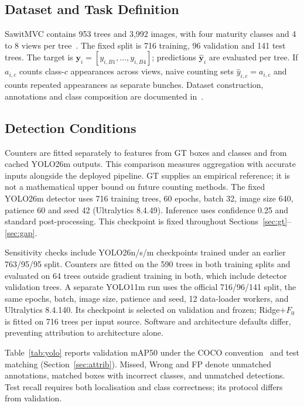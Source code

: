 \documentclass[conference,a4paper]{IEEEtran}
\begin{document}
\subsection{Dataset and Task Definition}
\label{sec:task}
SawitMVC contains 953 trees and 3,992 images, with four maturity classes and
4 to 8 views per tree~\cite{refIndriani2026}. The fixed split is 716 training,
96 validation and 141 test trees. The target is
$\mathbf y_i=[y_{i,B1},\ldots,y_{i,B4}]$; predictions
$\hat{\mathbf y}_i$ are evaluated per tree. If $a_{i,c}$ counts class-$c$
appearances across views, naive counting sets $\hat y_{i,c}=a_{i,c}$ and counts
repeated appearances as separate bunches. Dataset construction, annotations
and class composition are documented in~\cite{refIndriani2026}.

\subsection{Detection Conditions}
Counters are fitted separately to features from GT boxes and classes and from
cached YOLO26m outputs. This comparison measures aggregation with accurate
inputs alongside the deployed pipeline. GT supplies an empirical reference;
it is not a mathematical upper bound on future counting methods. The fixed YOLO26m detector uses 716 training trees, 60 epochs,
batch 32, image size 640, patience 60 and seed 42 (Ultralytics 8.4.49). Inference
uses confidence 0.25 and standard post-processing. This checkpoint is fixed
throughout Sections~\ref{sec:gt}--\ref{sec:gap}.

Sensitivity checks include YOLO26n/s/m checkpoints trained under an earlier
763/95/95 split. Counters are fitted on the 590 trees in both training splits
and evaluated on 64 trees outside gradient training in both, which include
detector validation trees. A separate YOLO11m run uses the official 716/96/141 split,
the same epochs, batch, image size, patience and seed, 12 data-loader workers,
and Ultralytics 8.4.140. Its checkpoint is selected on validation and frozen;
Ridge$+F_0$ is fitted on 716 trees per input source. Software and architecture
defaults differ, preventing attribution to architecture alone.

Table~\ref{tab:yolo} reports validation mAP50 under the COCO
convention~\cite{ref16} and test matching (Section~\ref{sec:attrib}). Missed,
Wrong and FP denote unmatched annotations, matched boxes with incorrect classes,
and unmatched detections. Test recall requires both localisation and class
correctness; its protocol differs from validation.
\end{document}
